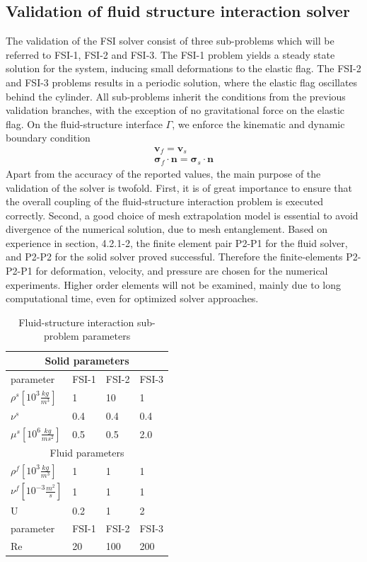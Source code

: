 \subsection{Validation of fluid structure interaction solver}
\label{sec:fsi3}
The validation of the FSI solver consist of three sub-problems which will be referred to FSI-1, FSI-2 and FSI-3. The FSI-1 problem yields a steady state solution for the system, inducing small deformations to the elastic flag. The FSI-2 and FSI-3 problems results in a periodic solution, where the elastic flag oscillates behind the cylinder. All sub-problems inherit the conditions from the previous validation branches, with the exception of no gravitational force on the elastic flag. On the fluid-structure interface $\Gamma$, we enforce the kinematic and dynamic boundary condition
\begin{align}
\mathbf{v}_f = \mathbf{v}_s \\
\mathbf{\sigma}_f \cdot \mathbf{n} = \mathbf{\sigma}_s \cdot \mathbf{n}
\end{align}
Apart from the accuracy of the reported values, the main purpose of the validation of the solver is twofold. First, it is of great importance to ensure that the overall coupling of the fluid-structure interaction problem is executed correctly. Second, a good choice of mesh extrapolation model is essential to avoid divergence of the numerical solution, due to mesh entanglement.  Based on experience in section, 4.2.1-2, the finite element pair P2-P1 for the fluid solver, and P2-P2 for the solid solver proved successful. Therefore the finite-elements P2-P2-P1 for deformation, velocity, and pressure are chosen for the numerical experiments. Higher order elements will not be examined, mainly due to long computational time, even for optimized solver approaches.
\newpage
\begin{table}[h!]
\centering
\label{my-label}
\begin{tabular}{ |p{3cm}||p{2cm}|p{2cm}|p{2cm}|  }
 \hline
 \multicolumn{4}{|c|}{Solid parameters} \\
 \hline
 parameter              & FSI-1 & FSI-2 & FSI-3 \\
 \hline
 $\rho^s [10^{3} \frac{kg}{m^3}]$ & 1    & 10   & 1    \\
$\nu^s$ & 0.4  & 0.4  & 0.4  \\
$\mu^s  [10^{6}\frac{kg}{ms^2}]$  & 0.5  & 0.5  & 2.0  \\
 \hline
 \multicolumn{4}{|c|}{Fluid parameters} \\
 \hline
$\rho^f [10^{3}\frac{kg}{m^3}]$ & 1    & 1    & 1    \\
$\nu^f  [10^{-3}\frac{m^2}{s}]$  & 1    & 1    & 1    \\
U                      & 0.2  & 1    & 2    \\
parameter              & FSI-1 & FSI-2 & FSI-3 \\
Re                     & 20   & 100  & 200 \\
\hline
\end{tabular}
\caption{Fluid-structure interaction sub-problem parameters}
\end{table}
